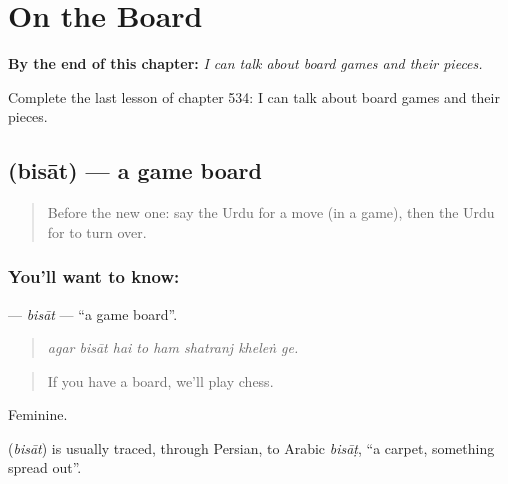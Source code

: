 
\chapter{On the Board}
\label{ch:ur-on-the-board}

\begin{chapteropening}
\textbf{By the end of this chapter:} \emph{I can talk about board games and their pieces.}

Complete the last lesson of chapter 534: I can talk about board games and their pieces.
\end{chapteropening}

\section[\texorpdfstring{\ur{بساط} (bisāt)}{بساط (bisāt)}]{ (bisāt) — a game board}

\label{lesson:UR-C534-bisat}



\begin{quote}
Before the new one: say the Urdu for a move (in a game), then the Urdu for to turn over.
\end{quote}

\subsection*{You'll want to know: }
\textbf{} — \emph{bisāt} — \textquotedblleft{}a game board\textquotedblright{}.

\begin{quote}
       
\end{quote}

\begin{quote}
\emph{agar bisāt hai to ham shatranj kheleṅ ge.}
\end{quote}

\begin{quote}
If you have a board, we'll play chess.
\end{quote}

Feminine.

\begin{cousinweb}
\textbf{} (\emph{bisāt}) is usually traced, through Persian, to Arabic \emph{bisāṭ}, \textquotedblleft{}a carpet, something spread out\textquotedblright{}.
\end{cousinweb}

